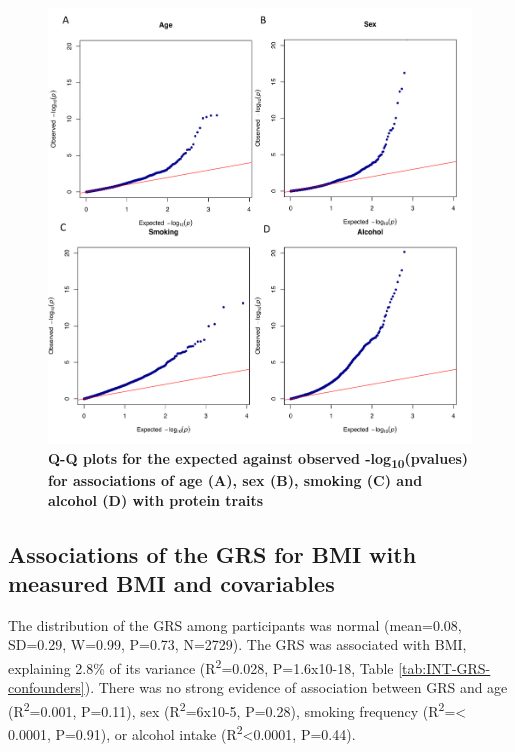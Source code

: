 \documentclass[11pt,twoside]{bristolthesis}
\begin{document}
\begin{figure}
\includegraphics[width=0.95\linewidth]{figure/BMI_protein_INTERVAL/QQ_confounder_proteins} \caption[Q-Q plots of the expected against observed -log\textsubscript{10}(pvalues) for the associations between covariables and protein traits]{\textbf{Q-Q plots for the expected against observed -log\textsubscript{10}(pvalues) for associations of age (A), sex (B), smoking (C) and alcohol (D) with protein traits}}\label{fig:QQ-confounder-proteins}
\end{figure}
\hypertarget{associations-of-the-grs-for-bmi-with-measured-bmi-and-covariables}{%
\subsection{Associations of the GRS for BMI with measured BMI and covariables}\label{associations-of-the-grs-for-bmi-with-measured-bmi-and-covariables}}

The distribution of the GRS among participants was normal (mean=0.08, SD=0.29, W=0.99, P=0.73, N=2729). The GRS was associated with BMI, explaining 2.8\% of its variance (R\textsuperscript{2}=0.028, P=1.6x10-18, Table \ref{tab:INT-GRS-confounders}). There was no strong evidence of association between GRS and age (R\textsuperscript{2}=0.001, P=0.11), sex (R\textsuperscript{2}=6x10-5, P=0.28), smoking frequency (R\textsuperscript{2}=\textless{} 0.0001, P=0.91), or alcohol intake (R\textsuperscript{2}\textless0.0001, P=0.44).
\end{document}
